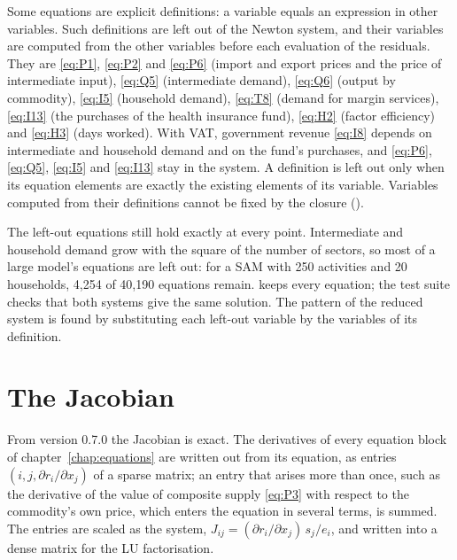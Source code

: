 Some equations are explicit definitions: a variable equals an expression in
other variables. Such definitions are left out of the Newton system, and their
variables are computed from the other variables before each evaluation of the
residuals. They are \eqref{eq:P1}, \eqref{eq:P2} and \eqref{eq:P6} (import and
export prices and the price of intermediate input), \eqref{eq:Q5}
(intermediate demand), \eqref{eq:Q6} (output by commodity), \eqref{eq:I5}
(household demand), \eqref{eq:T8} (demand for margin services),
\eqref{eq:I13} (the purchases of the health insurance fund), \eqref{eq:H2}
(factor efficiency) and \eqref{eq:H3} (days worked). With VAT, government
revenue \eqref{eq:I8} depends on intermediate and household demand and on the
fund's purchases, and \eqref{eq:P6}, \eqref{eq:Q5}, \eqref{eq:I5} and
\eqref{eq:I13} stay in the system. A definition is left out only when its
equation elements are exactly the existing elements of its variable.
Variables computed from their definitions cannot be fixed by the closure
().

The left-out equations still hold exactly at every point. Intermediate and
household demand grow with the square of the number of sectors, so most of a
large model's equations are left out: for a SAM with 250 activities and 20
households, 4,254 of 40,190 equations remain.  keeps
every equation; the test suite checks that both systems give the same
solution. The pattern of the reduced system is found by substituting each
left-out variable by the variables of its definition.

\section{The Jacobian}\label{sec:jacobian}

From version 0.7.0 the Jacobian is exact. The derivatives of every equation
block of chapter~\ref{chap:equations} are written out from its equation, as
entries $(i, j, \partial r_i / \partial x_j)$ of a sparse matrix; an entry
that arises more than once, such as the derivative of the value of composite
supply \eqref{eq:P3} with respect to the commodity's own price, which enters
the equation in several terms, is summed. The entries are scaled as the system,
$J_{ij} = (\partial r_i / \partial x_j)\, s_j / e_i$, and written into a dense
matrix for the LU factorisation.


